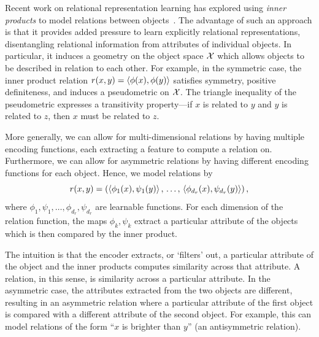 Recent work on relational representation learning has explored using \textit{inner products} to model relations between objects~\citep[e.g.,][]{webbEmergentSymbols2021, kergNeuralArchitecture2022, altabaaAbstractorsTransformer2023}. The advantage of such an approach is that it provides added pressure to learn explicitly relational representations, disentangling relational information from attributes of individual objects. In particular, it induces a geometry on the object space ${\mathcal{X}}$ which allows objects to be described in relation to each other. For example, in the symmetric case, the inner product relation $r(x,y) = \left \langle \phi(x), \phi(y) \right\rangle$ satisfies symmetry, positive definiteness, and induces a pseudometric on ${\mathcal{X}}$. The triangle inequality of the pseudometric expresses a transitivity property---if $x$ is related to $y$ and $y$ is related to $z$, then $x$ must be related to $z$.

More generally, we can allow for multi-dimensional relations by having multiple encoding functions, each extracting a feature to compute a relation on. Furthermore, we can allow for asymmetric relations by having different encoding functions for each object. Hence, we model relations by
\begin{equation}\label{eq:relation_function}
    r(x, y) = \left(
        \left \langle \phi_1(x), \psi_1(y) \right\rangle,\, \ldots,\, \left \langle \phi_{d_r}(x), \psi_{d_r}(y) \right\rangle\right),
\end{equation}
where $\phi_1, \psi_1, \ldots, \phi_{d_r}, \psi_{d_r}$ are learnable functions. For each dimension of the relation function, the maps $\phi_k, \psi_k$ extract a particular attribute of the objects which is then compared by the inner product.

The intuition is that the encoder extracts, or `filters' out, a particular attribute of the object and the inner products computes similarity across that attribute. A relation, in this sense, is similarity across a particular attribute. In the asymmetric case, the attributes extracted from the two objects are different, resulting in an asymmetric relation where a particular attribute of the first object is compared with a different attribute of the second object. For example, this can model relations of the form ``$x$ is brighter than $y$'' (an antisymmetric relation).

